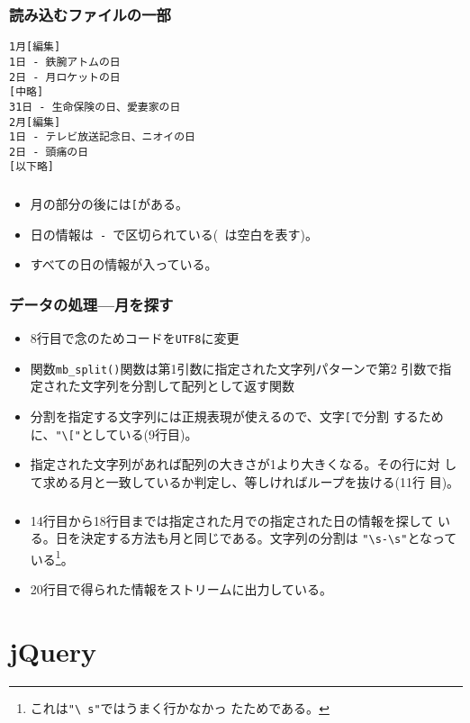 \begin{frame}[containsverbatim]
\frametitle{読み込むファイルの一部}
\begin{Verbatim}
1月[編集]
1日 - 鉄腕アトムの日
2日 - 月ロケットの日
[中略]
31日 - 生命保険の日、愛妻家の日
2月[編集]
1日 - テレビ放送記念日、ニオイの日
2日 - 頭痛の日
[以下略]
\end{Verbatim}
\end{frame}
\begin{frame}[containsverbatim]
\frametitle{}
\begin{itemize}
 \item 月の部分の後には\texttt{[}がある。
 \item 日の情報は\verb*+ - +で区切られている(\verb*+ +は空白を表す)。
 \item すべての日の情報が入っている。
\end{itemize}
\end{frame}
\begin{frame}[containsverbatim]
\frametitle{データの処理---月を探す}
\begin{itemize}
 \item 8行目で念のためコードを\texttt{UTF8}に変更
 \item 関数\Verb+mb_split()+関数は第1引数に指定された文字列パターンで第2
       引数で指定された文字列を分割して配列として返す関数
 \item 分割を指定する文字列には正規表現が使えるので、文字\Verb+[+で分割
       するために、\Verb+"\["+としている(9行目)。
 \item 指定された文字列があれば配列の大きさが1より大きくなる。その行に対
       して求める月と一致しているか判定し、等しければループを抜ける(11行
       目)。
\end{itemize}
\end{frame}
\begin{frame}[containsverbatim]
\frametitle{}
\begin{itemize}
 \item 14行目から18行目までは指定された月での指定された日の情報を探して
       いる。日を決定する方法も月と同じである。文字列の分割は
       \verb+"\s-\s"+となっている\footnote{これは\texttt{"\textbackslash
       s"}ではうまく行かなかっ
       たためである。}。
 \item 20行目で得られた情報をストリームに出力している。
\end{itemize}
\end{frame}
\section{jQuery}
